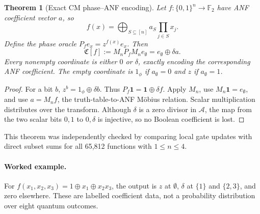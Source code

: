 \documentclass[11pt,a4paper]{article}
\newtheorem{theorem}{Theorem}[section]
\theoremstyle{definition}\newtheorem{definition}[theorem]{Definition}
\theoremstyle{remark}\newtheorem{remark}[theorem]{Remark}
\newcommand{\F}{\mathbb F}
\newcommand{\alg}{\mathcal A}
\newcommand{\one}{1_{\phi}}
\numberwithin{equation}{section}
\begin{document}
\begin{theorem}[Exact CM phase--ANF encoding]\label{thm:phaseanf}
Let $f:\{0,1\}^n\to\F_2$ have ANF coefficient vector $a$, so
\begin{equation}
 f(x)=\bigoplus_{S\subseteq[n]} a_S\prod_{j\in S}x_j.
\end{equation}
Define the phase oracle $P_f e_x=z^{f(x)}e_x$. Then
\begin{equation}\label{eq:main}
 \mathfrak C[f]:=M_nP_fM_ne_\emptyset
 =e_\emptyset\oplus\delta a.
\end{equation}
Every nonempty coordinate is either $0$ or $\delta$, exactly encoding the corresponding ANF coefficient. The empty coordinate is $\one$ if $a_\emptyset=0$ and $z$ if $a_\emptyset=1$.
\end{theorem}
\begin{proof}
For a bit $b$, $z^b=\one\oplus\delta b$. Thus $P_f\mathbf1=\mathbf1\oplus\delta f$. Apply $M_n$, use $M_n\mathbf1=e_\emptyset$, and use $a=M_nf$, the truth-table-to-ANF M\"obius relation. Scalar multiplication distributes over the transform. Although $\delta$ is a zero divisor in $\alg$, the map from the two scalar bits $0,1$ to $0,\delta$ is injective, so no Boolean coefficient is lost.
\end{proof}
This theorem was independently checked by comparing local gate updates with direct subset sums for all 65,812 functions with $1\le n\le4$.

\paragraph{Worked example.}
For $f(x_1,x_2,x_3)=1\oplus x_1\oplus x_2x_3$, the output is $z$ at $\emptyset$, $\delta$ at $\{1\}$ and $\{2,3\}$, and zero elsewhere. These are labelled coefficient data, not a probability distribution over eight quantum outcomes.
\end{document}
